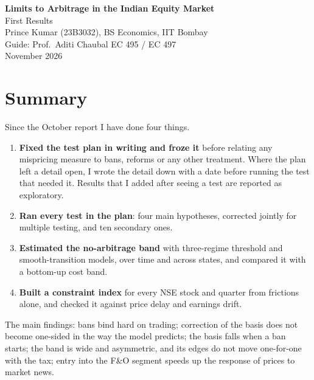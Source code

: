 \documentclass[11pt,a4paper]{article}
\begin{document}
\begin{center}
{\Large\bfseries\color{accent} Limits to Arbitrage in the Indian Equity Market}\\[4pt]
{\large First Results}\\[8pt]
Prince Kumar (23B3032), BS Economics, IIT Bombay\\
Guide: Prof.\ Aditi Chaubal \quad\textbar\quad EC 495 / EC 497\\
November 2026
\end{center}
\vspace{4pt}

\section{Summary}
Since the October report I have done four things.
\begin{enumerate}
\item \textbf{Fixed the test plan in writing and froze it} before relating any mispricing measure to bans, reforms or any
other treatment. Where the plan left a detail open, I wrote the detail down with a date before running the test that
needed it. Results that I added after seeing a test are reported as exploratory.
\item \textbf{Ran every test in the plan}: four main hypotheses, corrected jointly for multiple testing, and ten secondary
ones.
\item \textbf{Estimated the no-arbitrage band} with three-regime threshold and smooth-transition models, over time and
across states, and compared it with a bottom-up cost band.
\item \textbf{Built a constraint index} for every NSE stock and quarter from frictions alone, and checked it against price
delay and earnings drift.
\end{enumerate}
The main findings: bans bind hard on trading; correction of the basis does not become one-sided in the way the model
predicts; the basis falls when a ban starts; the band is wide and asymmetric, and its edges do not move one-for-one with the
tax; entry into the F\&O segment speeds up the response of prices to market news.
\end{document}
